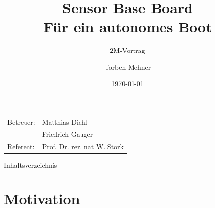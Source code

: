 \documentclass{beamer}
\title{Sensor Base Board\\ Für ein autonomes Boot}
\date{\today}
\author{Torben Mehner}
\subtitle{2M-Vortrag}
\institute{FZI, ESS}
\begin{document}
	
\begin{frame}
	\begin{titlepage}
		
	\end{titlepage}

	\vspace{30ex}

	{\color{fzi-gray} \scriptsize \hspace{-2ex}
	\begin{tabular}{l l}
		Betreuer: & Matthias Diehl \\
		& Friedrich Gauger \\
		Referent: & Prof. Dr. rer. nat W. Stork
	\end{tabular}}
\end{frame}

\begin{frame}{Inhaltsverzeichnis}
	\tableofcontents[sectionstyle=show,subsectionstyle=hide]
\end{frame}



\section{Motivation}
\end{document}
